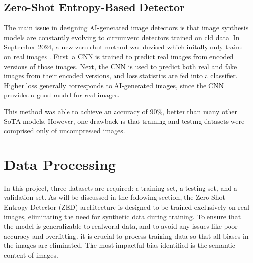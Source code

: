\documentclass{article} %
\begin{document}
\subsection{Zero-Shot Entropy-Based Detector}
\label{ZED}

The main issue in designing AI-generated image detectors is that image synthesis models are constantly evolving to circumvent detectors trained on old data. In September 2024, a new zero-shot method was devised which initally only trains on real images \citep{cozzolino2024zeroshotdetectionaigeneratedimages}. First, a CNN is trained to predict real images from encoded versions of those images. Next, the CNN is used to predict both real and fake images from their encoded versions, and loss statistics are fed into a classifier. Higher loss generally corresponds to AI-generated images, since the CNN provides a good model for real images.

This method was able to achieve an accuracy of 90\%, better than many other SoTA models. However, one drawback is that training and testing datasets were comprised only of uncompressed images.

\section{Data Processing}
\label{data}
In this project, three datasets are required: a training set, a testing set, and a validation set. As will be discussed in the following section, the Zero-Shot Entropy Detector (ZED) architecture is designed to be trained exclusively on real images, eliminating the need for synthetic data during training. To ensure that the model is generalizable to realworld data, and to avoid any issues like poor accuracy and overfitting, it is crucial to process training data so that all biases in the images are eliminated. The most impactful bias identified is the semantic content of images.
\end{document}
